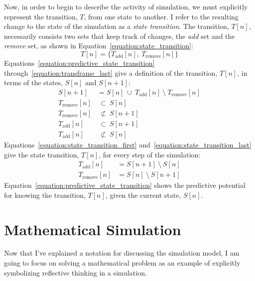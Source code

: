 Now, in order to begin to describe the activity of simulation, we must
explicitly represent the transition, $T$, from one state to another.
I refer to the resulting change to the state of the simulation as a
\emph{state transition}.  The transition, $T[n]$, necessarily consists
two sets that keep track of changes, the \emph{add} set and the
\emph{remove} set, as shown in
Equation~\ref{equation:state_transition}:
\begin{equation}
\label{equation:state_transition}
T[n] = \{T_\text{add}[n], ~T_\text{remove}[n]\}
\end{equation}
Equations~\ref{equation:predictive_state_transition}
through~\ref{equation:transframe_last} give a definition of the
transition, $T[n]$, in terms of the states, $S[n]$ and $S[n+1]$:
\begin{align}
\label{equation:predictive_state_transition}
                    S[n+1] & = S[n] ~{\cup}~ T_\text{add}[n] ~{\setminus}~ T_\text{remove}[n] \\
         T_\text{remove}[n] & ~{\subset}~ S[n] \\
         T_\text{remove}[n] & ~{\not\subset}~ S[n+1] \\
            T_\text{add}[n] & ~{\subset}~ S[n+1] \\
\label{equation:transframe_last}
            T_\text{add}[n] & ~{\not\subset}~ S[n]
\end{align}
Equations~\ref{equation:state_transition_first}
and~\ref{equation:state_transition_last} give the state transition,
$T[n]$, for every step of the simulation:
\begin{align}
  \label{equation:state_transition_first}
     T_\text{add}[n] &= S[n+1] ~{\setminus}~ S[n] \\
  \label{equation:state_transition_last}
  T_\text{remove}[n] &= S[n]   ~{\setminus}~ S[n+1]
\end{align}
Equation~\ref{equation:predictive_state_transition} shows the
predictive potential for knowing the transition, $T[n]$, given the
current state, $S[n]$.

\section{Mathematical Simulation}

Now that I've explained a notation for discussing the simulation
model, I am going to focus on solving a mathematical problem as an
example of explicitly symbolizing reflective thinking in a simulation.

